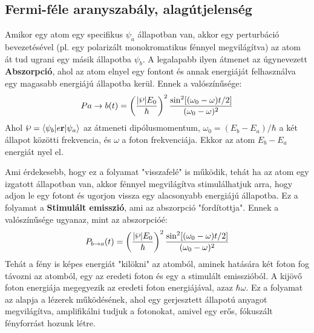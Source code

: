 \documentclass[../main.tex]{subfiles}
\begin{document}
\subsection{Fermi-féle aranyszabály, alagútjelenség}
Amikor egy atom egy specifikus $\psi_a$ állapotban van, akkor egy perturbáció bevezetésével (pl. egy polarizált monokromatikus fénnyel megvilágítva) az atom át tud ugrani egy másik állapotba $\psi_b$.
A legalapabb ilyen átmenet az úgynevezett \textbf{Abszorpció}, ahol az atom elnyel egy fontont és annak energiáját felhasználva egy magasabb energiájú állapotba kerül. Ennek a valószínűsége:
\begin{equation}
    P{a \to b} (t) = \left(\frac{|\pw| E_0}{\hbar}\right)^2 \frac{\sin^2 [(\omega_0 - \omega)t/2]}{(\omega_0 - \omega)^2}
\end{equation}
Ahol $\pw = \langle \psi_b | e \mathbf{r} | \psi_a \rangle$ az átmeneti dipólusmomentum, $\omega_0 = (E_b - E_a)/\hbar$ a két állapot közötti frekvencia, és $\omega$ a foton frekvenciája.
Ekkor az atom $E_b - E_a$ energiát nyel el. 

Ami érdekesebb, hogy ez a folyamat "visszafelé" is működik, tehát ha az atom egy izgatott állapotban van, akkor fénnyel megvilágítva stimulálhatjuk arra, hogy adjon le egy fotont és ugorjon vissza egy alacsonyabb energiájú állapotba.
Ez a folyamat a \textbf{Stimulált emisszió}, ami az abszorpció "fordítottja". Ennek a valószínűsége ugyanaz, mint az abszorpcióé:
\begin{equation}
    P_{b \to a} (t) = \left(\frac{|\pw| E_0}{\hbar}\right)^2 \frac{\sin^2 [(\omega_0 - \omega)t/2]}{(\omega_0 - \omega)^2}
\end{equation}
Tehát a fény is képes energiát "kilökni" az atomból, aminek hatására két foton fog távozni az atomból, egy az eredeti foton és egy a stimulált emisszióból. A kijövő foton energiája 
megegyezik az eredeti foton energiájával, azaz $\hbar \omega$. Ez a folyamat az alapja a lézerek működésének, ahol egy gerjesztett állapotú anyagot megvilágítva, amplifikálni tudjuk a fotonokat, amivel egy erős,
fókuszált fényforrást hozunk létre.
\end{document}
